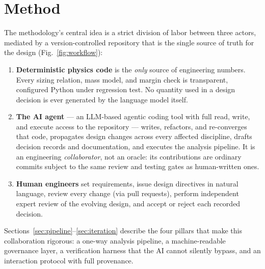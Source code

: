 \section{Method}
\label{sec:method}

The methodology's central idea is a strict division of labor between
three actors, mediated by a version-controlled repository that is the
single source of truth for the design
(Fig.~\ref{fig:workflow}):

\begin{enumerate}[nosep,label=(\roman*)]
\item \textbf{Deterministic physics code} is the \emph{only} source of
  engineering numbers. Every sizing relation, mass model, and margin
  check is transparent, configured Python under regression test. No
  quantity used in a design decision is ever generated by the language
  model itself.
\item \textbf{The AI agent} --- an LLM-based agentic coding tool
  \citep{anthropic2025claudecode} with full read, write, and execute
  access to the repository --- writes, refactors, and re-converges
  that code,
  propagates design changes across every affected discipline, drafts
  decision records and documentation, and executes the analysis
  pipeline. It is an engineering \emph{collaborator}, not an oracle:
  its contributions are ordinary commits subject to the same review
  and testing gates as human-written ones.
\item \textbf{Human engineers} set requirements, issue design
  directives in natural language, review every change (via pull
  requests), perform independent expert review of the evolving design,
  and accept or reject each recorded decision.
\end{enumerate}

Sections~\ref{sec:pipeline}--\ref{sec:iteration} describe the four
pillars that make this collaboration rigorous: a one-way analysis
pipeline, a machine-readable governance layer, a verification harness
that the AI cannot silently bypass, and an interaction protocol with
full provenance.

